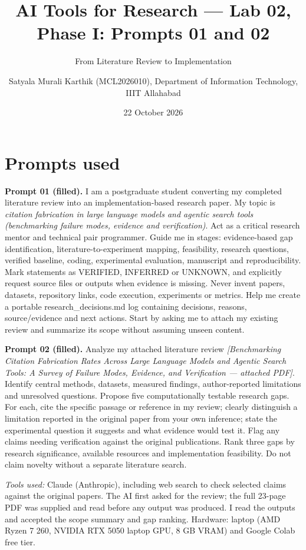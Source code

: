 \documentclass[
  10pt,
]{article}
\title{AI Tools for Research --- Lab 02, Phase I: Prompts 01 and 02}
\subtitle{From Literature Review to Implementation}
\author{Satyala Murali Karthik (MCL2026010), Department of Information
Technology, IIIT Allahabad}
\date{22 October 2026}
\begin{document}
\maketitle

\hypertarget{prompts-used}{%
\section{Prompts used}\label{prompts-used}}

\textbf{Prompt 01 (filled).} I am a postgraduate student converting my
completed literature review into an implementation-based research paper.
My topic is \emph{citation fabrication in large language models and
agentic search tools (benchmarking failure modes, evidence and
verification)}. Act as a critical research mentor and technical pair
programmer. Guide me in stages: evidence-based gap identification,
literature-to-experiment mapping, feasibility, research questions,
verified baseline, coding, experimental evaluation, manuscript and
reproducibility. Mark statements as VERIFIED, INFERRED or UNKNOWN, and
explicitly request source files or outputs when evidence is missing.
Never invent papers, datasets, repository links, code execution,
experiments or metrics. Help me create a portable research\_decisions.md
log containing decisions, reasons, source/evidence and next actions.
Start by asking me to attach my existing review and summarize its scope
without assuming unseen content.

\textbf{Prompt 02 (filled).} Analyze my attached literature review
\emph{{[}Benchmarking Citation Fabrication Rates Across Large Language
Models and Agentic Search Tools: A Survey of Failure Modes, Evidence,
and Verification --- attached PDF{]}}. Identify central methods,
datasets, measured findings, author-reported limitations and unresolved
questions. Propose five computationally testable research gaps. For
each, cite the specific passage or reference in my review; clearly
distinguish a limitation reported in the original paper from your own
inference; state the experimental question it suggests and what evidence
would test it. Flag any claims needing verification against the original
publications. Rank three gaps by research significance, available
resources and implementation feasibility. Do not claim novelty without a
separate literature search.

\emph{Tools used:} Claude (Anthropic), including web search to check
selected claims against the original papers. The AI first asked for the
review; the full 23-page PDF was supplied and read before any output was
produced. I read the outputs and accepted the scope summary and gap
ranking. Hardware: laptop (AMD Ryzen 7 260, NVIDIA RTX 5050 laptop GPU,
8 GB VRAM) and Google Colab free tier.
\end{document}
